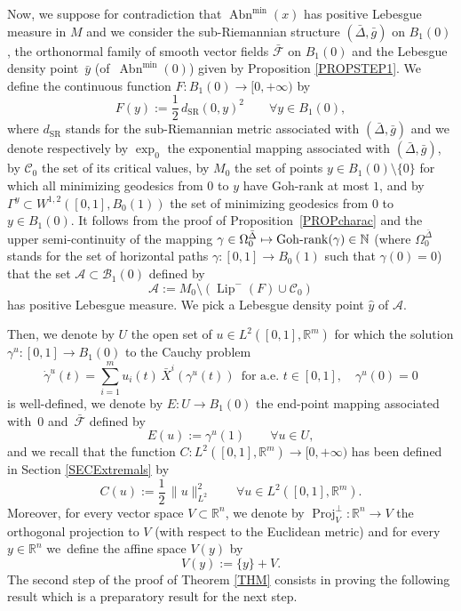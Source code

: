 \documentclass[JEP,XML,SOM,Unicode,NoFloatCountersInSection,published]{cedram}
\newcommand\mto{\mathchoice{\longmapsto}{\mapsto}{\mapsto}{\mapsto}}
\newcommand{\SR}{{\scriptscriptstyle\mathrm{SR}}}
\DeclareMathOperator{\Abn}{Abn}
\DeclareMathOperator{\Gohrank}{Goh\textup{-}rank}
\DeclareMathOperator{\Lip}{Lip}
\DeclareMathOperator{\Proj}{Proj}
\newcommand\R{\mathbb R}
\newcommand\N{\mathbb N}
\theoremstyle{definition}
\begin{document}
Now, we suppose for contradiction that $\Abn^{\min}(x)$ has positive Lebesgue measure in $M$ and we consider the sub-Riemannian structure $(\bar{\Delta},\bar{g})$ on $B_1(0)$, the orthonormal family of smooth vector fields $\bar{\mathcal{F}}$ on $B_1(0)$ and the Lebesgue density point~$\bar{y}$ (of~$\Abn^{\min}(0)$) given by Proposition \ref{PROPSTEP1}. We define the continuous function $F:B_1(0)\to [0,+\infty)$ by
\[
F(y):= \frac{1}{2}\, d_{\SR} (0,y)^2 \qquad \forall y \in B_1(0),
\]
where $d_{\SR}$ stands for the sub-Riemannian metric associated with $(\bar{\Delta},\bar{g})$ and we denote respectively by $\exp_0$ the exponential mapping associated with $(\bar{\Delta},\bar{g})$, by $\mathcal{C}_0$ the set of its critical values, by $M_0$ the set of points $y\in B_1(0)\setminus\{0\}$ for which all minimizing geodesics from $0$ to $y$ have Goh-rank at most $1$, and by $\Gamma^y \subset W^{1,2}([0,1],B_0(1))$ the set of minimizing geodesics from $0$ to $y\in B_1(0)$. It follows from the proof of Proposition~\ref{PROPcharac} and the upper semi-continuity of the mapping $\gamma \in \Omega^{\bar{\Delta}}_0 \mto \Gohrank(\gamma)\in \N$ (where $\Omega^{\bar{\Delta}}_0$ stands for the set of horizontal paths $\gamma:[0,1] \to B_0(1)$ such that $\gamma(0)=0$) that the set $\mathcal{A} \subset \mathcal{B}_1(0)$ defined by
\begin{equation}\label{20janv3}
\mathcal{A} := M_0 \setminus \left(\Lip^-(F) \cup \mathcal{C}_0 \right)
\end{equation}
has positive Lebesgue measure. We pick a Lebesgue density point $\hat{y}$ of $\mathcal{A}$.

Then, we denote by $U$ the open set of $u \in L^2([0,1],\R^m)$ for which the solution $\gamma^u:[0,1] \to B_1(0)$ to the Cauchy problem
\[
\dot{\gamma}^u (t) = \sum_{i=1}^m u_i(t) \, \bar{X}^i \left(\gamma^u(t)\right) \, \text{ for a.e. } t \in [0,1], \quad \gamma^u(0)=0
\]
is well-defined, we denote by $E:U \to B_1(0)$ the end-point mapping associated with~$0$ and~$\bar{\mathcal{F}}$ defined by
\[
E(u) := \gamma^u(1) \qquad \forall u \in U,
\]
and we recall that the function $C: L^2([0,1],\R^m)\to [0,+\infty)$ has been defined in Section \ref{SECExtremals} by
\[
C(u) :=\frac{1}{2}\, \|u\|_{L^2}^2 \qquad \forall u \in L^2([0,1],\R^m).
\]
Moreover, for every vector space $V \subset\R^n$, we denote by $\Proj_{V}^{\perp}:\R^n \to V$ the orthogonal projection to $V$ (with respect to the Euclidean metric) and for every $y\in \R^n$ we~define the affine space $V(y)$ by
\[
V(y) := \{y\} + V.
\]
The second step of the proof of Theorem \ref{THM} consists in proving the following result which is a preparatory result for the next step.
\end{document}
